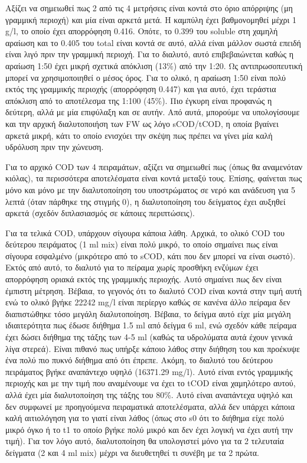 \documentclass[11pt]{article}
\begin{document}
Αξίζει να σημειωθεί πως 2 από τις 4 μετρήσεις είναι κοντά στο όριο απόρριψης (μη γραμμική περιοχή) και μία είναι αρκετά μετά. Η καμπύλη έχει βαθμονομηθεί μέχρι 1 g/l, το οποίο έχει απορρόφηση 0.416. Οπότε, το 0.399 του soluble στη χαμηλή αραίωση και το 0.405 του total είναι κοντά σε αυτό, αλλά είναι μάλλον σωστά επειδή είναι λιγό πριν την γραμμική περιοχή. Για το διαλυτό, αυτό επιβεβαιώνεται καθώς η αραίωση 1:50 έχει μικρή σχετικά απόκλιση (13\%) από την 1:20. Ως αντιπρωσοπευτική μπορεί να χρησιμοποιηθεί ο μέσος όρος. Για το ολικό, η αραίωση 1:50 είναι πολύ εκτός της γραμμικής περιοχής (απορρόφηση 0.447) και για αυτό, έχει τεράστια απόκλιση από το αποτέλεσμα της 1:100 (45\%). Πιο έγκυρη είναι προφανώς η δεύτερη, αλλά με μία επιφύλαξη και σε αυτήν. Από αυτά, μπορούμε να υπολογίσουμε και την αρχική διαλυτοποιήση των FW ως λόγο sCOD/tCOD, η οποία βγαίνει αρκετά μικρή, κάτι το οποίο ενισχύει την σκέψη πως πρέπει να γίνει μία καλή υδρόλυση πριν την χώνευση.

Για το αρχικό COD των 4 πειραμάτων, αξίζει να σημειωθεί πως (όπως θα αναμενόταν κιόλας), τα περισσότερα αποτελέσματα είναι κοντά μεταξύ τους. Επίσης, φαίνεται πως μόνο και μόνο με την διαλυτοποίηση του υποστρώματος σε νερό και ανάδευση για 5 λεπτά (όταν πάρθηκε της στιγμής 0), η διαλυτοποίηση του δείγματος έχει αυξηθεί αρκετά (σχεδόν διπλασιασμός σε κάποιες περιπτώσεις).

Για τα τελικά COD, υπάρχουν σίγουρα κάποια λάθη. Αρχικά, το ολικό COD του δεύτερου πειράματος (1 ml mix) είναι πολύ μικρό, το οποίο σημαίνει πως είναι σίγουρα εσφαλμένο (μικρότερο από το sCOD, κάτι που δεν μπορεί να είναι σωστό). Εκτός από αυτό, το διαλυτό για το πείραμα χωρίς προσθήκη ενζύμων έχει απορρόφηση οριακά εκτός της γραμμικής περιοχής. Αυτό σημαίνει πως δεν είναι έμπιστη μέτρηση. Βέβαια, το γεγονός ότι το διαλυτό COD είναι κοντά στην τιμή αυτή ενώ το ολικό βγήκε 22242 mg/l είναι περίεργο καθώς σε κανένα άλλο πείραμα δεν διαπιστώθηκε τόσο μεγάλη διαλυτοποίηση. Βέβαια, το δείγμα αυτό είχε μία μεγάλη ιδιαιτερότητα πως έδωσε διήθημα 1.5 ml από δείγμα 6 ml, ενώ σχεδόν κάθε πείραμα έχει δώσει διήθημα της τάξης των 4-5 ml (καθώς τα υδρολύματα αυτά έχουν γενικά λίγα στερεά). Είναι πιθανό πως υπήρξε κάποιο λάθος στην διήθηση του και προέκυψε ένα πολύ πιο πυκνό διήθημα από ότι έπρεπε. Ακόμη, το διαλυτό του δεύτερου πειράματος βγήκε αναπάντεχο υψηλό (16371.29 mg/l). Αυτό είναι εντός γραμμικής περιοχής και με την τιμή που αναμένουμε να έχει το tCOD είναι χαμηλότερο αυτού, αλλά έχει μία διαλυτοποίηση της τάξης του 80\%. Αυτό είναι αναπάντεχα υψηλό και δεν συμφωνεί με προηγούμενα πειραματικά αποτελέσματα, αλλά δεν υπάρχει κάποια καλή αιτιολόγηση για το γιατί είναι λάθος (όπως στο s0 ότι το διήθημα είχε πολύ μικρό όγκο ή το t1 το οποίο βγήκε πολύ μικρό και δεν έχει λογική να έχει αυτή την τιμή). Για τον λόγο αυτό, διαλυτοποίηση θα υπολογιστεί μόνο για τα 2 τελευταία δείγματα (2 και 4 ml mix) μέχρι να διευθετηθεί τι συνέβη με τα 2 πρώτα.
\end{document}
